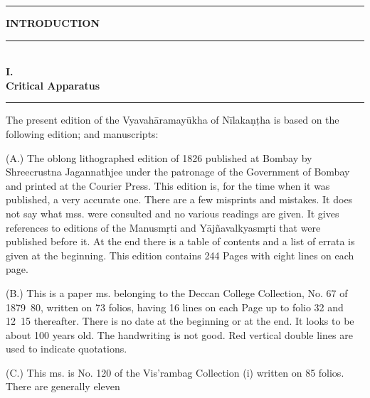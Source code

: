 \documentclass[11pt, openany]{book}
\begin{document}
\begin{center}
\rule{0.2\linewidth}{0.5pt}
\end{center}

\newpage
\thispagestyle{empty}
\begin{center}
\textbf{\LARGE INTRODUCTION}\\

\rule{0.4\linewidth}{0.5pt}\\

\vspace{1mm}
\textbf{\large I.}\\

\vspace{1mm}
\textbf{\large Critical Apparatus}\\

\rule{0.4\linewidth}{0.5pt}
\end{center}

The present edition of the Vyavahāramayūkha of Nīlakaṇṭha is based on the following edition; and manuscripts:\textendash

\hangindent=1.5cm (A.) The oblong lithographed edition of 1826 published at Bombay by {\qt Shreecrustna Jagannathjee} under the patronage of the Government of Bombay and printed at the Courier Press. This edition is, for the time when it was published, a very accurate one. There are a few misprints and mistakes. It does not say what mss. were consulted and no various readings are given. It gives references to editions of the Manusmṛti and Yājñavalkyasmṛti that were published before it. At the end there is a table of contents and a list of errata is given at the beginning. This edition contains 244 Pages with eight lines on each page.

\hangindent=1.5cm (B.) This is a paper ms. belonging to the Deccan College Collection, No. 67 of 1879\textendash\ 80, written on 73 folios, having 16 lines on each Page up to folio 32 and 12\textendash\ 15 thereafter. There is no date at the beginning or at the end. It looks to be about 100 years old. The handwriting is not good. Red vertical double lines are used to indicate quotations.

\hangindent=1.5cm (C.) This ms. is No. 120 of the Vis'rambag Collection (i) written on 85 folios. There are generally eleven

\fancyhead[RE,LO]{\thepage}
\cfoot{}
\newpage
\renewcommand{\thepage}{\Roman{page}}
\setcounter{page}{2}
\end{document}
